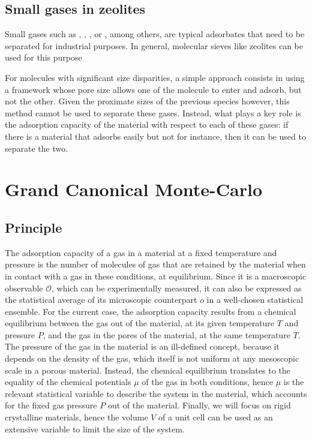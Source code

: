 \documentclass[main.tex]{subfiles}
\begin{document}
\subsection{Small gases in zeolites}

Small gases such as , , ,  or , among others, are typical adsorbates that need to be separated for industrial purposes. In general, molecular sieves like zeolites can be used for this purpose

For molecules with significant size disparities, a simple approach consists in using a framework whose pore size allows one of the molecule to enter and adsorb, but not the other. Given the proximate sizes of the previous species however, this method cannot be used to separate these gases. Instead, what plays a key role is the adsorption capacity of the material with respect to each of these gases: if there is a material that adsorbs  easily but not  for instance, then it can be used to separate the two.


\section{Grand Canonical Monte-Carlo}
\label{GCMC}

\subsection{Principle}

The adsorption capacity of a gas in a material at a fixed temperature and pressure is the number of molecules of gas that are retained by the material when in contact with a gas in these conditions, at equilibrium. Since it is a macroscopic observable $\mathcal O$, which can be experimentally measured, it can also be expressed as the statistical average of its microscopic counterpart $o$ in a well-chosen statistical ensemble. For the current case, the adsorption capacity results from a chemical equilibrium between the gas out of the material, at its given temperature $T$ and pressure $P$, and the gas in the pores of the material, at the same temperature $T$. The pressure of the gas in the material is an ill-defined concept, because it depends on the density of the gas, which itself is not uniform at any mesoscopic scale in a porous material. Instead, the chemical equilibrium translates to the equality of the chemical potentials $\mu$ of the gas in both conditions, hence $\mu$ is the relevant statistical variable to describe the system in the material, which accounts for the fixed gas pressure $P$ out of the material. Finally, we will focus on rigid crystalline materials, hence the volume $V$ of a unit cell can be used as an extensive variable to limit the size of the system.
\end{document}
